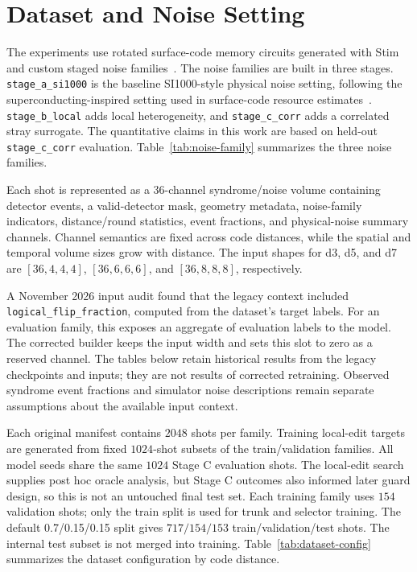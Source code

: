 \documentclass[aps,prd,12pt,twocolumn,superscriptaddress,floatfix,longbibliography]{revtex4-2}
\begin{document}
\section{Dataset and Noise Setting}

The experiments use rotated surface-code memory circuits generated with Stim
and custom staged noise families~\cite{stim}. The noise families are built in
three stages. \texttt{stage\_a\_si1000} is the baseline SI1000-style physical
noise setting, following the superconducting-inspired setting used in
surface-code resource estimates~\cite{honeycombmemory}. \texttt{stage\_b\_local} adds local heterogeneity, and
\texttt{stage\_c\_corr} adds a correlated stray surrogate. The quantitative
claims in this work are based on held-out \texttt{stage\_c\_corr}
evaluation. Table~\ref{tab:noise-family} summarizes the three noise families.

Each shot is represented as a 36-channel syndrome/noise volume containing
detector events, a valid-detector mask, geometry metadata, noise-family
indicators, distance/round statistics, event fractions, and physical-noise
summary channels. Channel semantics are fixed across code distances, while the
spatial and temporal volume sizes grow with distance. The input shapes for d3,
d5, and d7 are \([36,4,4,4]\), \([36,6,6,6]\), and \([36,8,8,8]\), respectively.

A November 2026 input audit found that the legacy context included
\texttt{logical\_flip\_fraction}, computed from the dataset's target labels.
For an evaluation family, this exposes an aggregate of evaluation labels to
the model. The corrected builder keeps the input width and sets this slot to
zero as a reserved channel. The tables below retain historical results from
the legacy checkpoints and inputs; they are not results of corrected
retraining. Observed syndrome event fractions and simulator noise descriptions
remain separate assumptions about the available input context.

Each original manifest contains \(2048\) shots per family. Training local-edit
targets are generated from fixed \(1024\)-shot subsets of the train/validation
families. All model seeds share the same \(1024\) Stage C evaluation shots.
The local-edit search supplies post hoc oracle analysis, but Stage C outcomes
also informed later guard design, so this is not an untouched final test set.
Each training family uses \(154\) validation shots; only the train split is
used for trunk and selector training. The default 0.7/0.15/0.15 split gives
\(717/154/153\) train/validation/test shots. The internal test subset is not
merged into training. Table~\ref{tab:dataset-config} summarizes
the dataset configuration by code distance.
\end{document}
